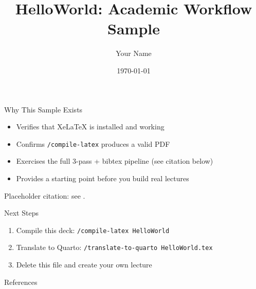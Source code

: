\documentclass{beamer}
\title{HelloWorld: Academic Workflow Sample}
\author{Your Name}
\institute{Your Institution}
\date{\today}
\begin{document}
\frame{\titlepage}

\begin{frame}{Why This Sample Exists}
    \begin{itemize}
        \item Verifies that XeLaTeX is installed and working
        \item Confirms \texttt{/compile-latex} produces a valid PDF
        \item Exercises the full 3-pass + bibtex pipeline (see citation below)
        \item Provides a starting point before you build real lectures
    \end{itemize}
    Placeholder citation: see \cite{Example2024_book}.
\end{frame}

\begin{frame}{Next Steps}
    \begin{enumerate}
        \item Compile this deck: \texttt{/compile-latex HelloWorld}
        \item Translate to Quarto: \texttt{/translate-to-quarto HelloWorld.tex}
        \item Delete this file and create your own lecture
    \end{enumerate}
\end{frame}

\begin{frame}{References}
    
    
\end{frame}
\end{document}
